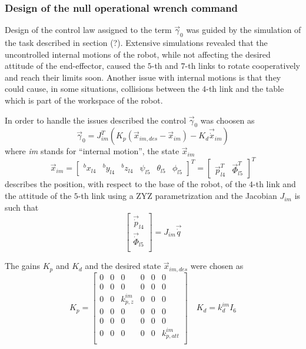 \subsubsection{Design of the null operational wrench command}
Design of the control law assigned to the term $\vec{\gamma}_{0}$ was
guided by the simulation of the task described in section (?). Extensive simulations
revealed that the uncontrolled internal motions of the robot, while not affecting the desired
attitude of the end-effector, caused the $5$-th and $7$-th links to rotate cooperatively and reach
their limits soon. Another issue with internal motions is that they could cause, in some situations,
collisions between the $4$-th link and the table which is part of the workspace of the robot.
\par
In order to handle the issues described the control $\vec{\gamma}_0$ was choosen as
\[
\vec{\gamma}_{0} = J_{im} ^{T} (K_p (\vec{x}_{im,des} - \vec{x}_{im} ) - K_d \vec{\dot{x}}_{im})
\]
where \emph{im} stands for ``internal motion'', the state $\vec{x}_{im}$
\[
\vec{x}_{im} =
\begin{bmatrix}
  {}^{b} x_{l4} & {}^{b} y_{l4} & {}^{b} z_{l4} & \psi_{l5} & \theta_{l5} & \phi_{l5}
\end{bmatrix}^{T} =
\begin{bmatrix}
  \vec{p}^{T}_{l4} & \vec{\Phi}^{T}_{l5}
\end{bmatrix}^{T}
\]
describes the position, with respect to the base of the robot, of the $4$-th link
and the attitude of the $5$-th link using a ZYZ parametrization and the Jacobian
$J_{im}$ is such that
\[
\begin{bmatrix}
  \vec{\dot{p}}_{l4} \\
  \vec{\dot{\Phi}}_{l5} \\
\end{bmatrix} =
J_{im} \vec{\dot{q}}
\]
\par
The gains $K_p$ and $K_d$ and the desired state $\vec{x}_{im,des}$ were chosen as
\[
K_p =
\begin{bmatrix}
  0 & 0 & 0 & 0 & 0 & 0\\
  0 & 0 & 0 & 0 & 0 & 0\\
  0 & 0 & k_{p,z}^{im} & 0 & 0 & 0\\
  0 & 0 & 0 & 0 & 0 & 0\\
  0 & 0 & 0 & 0 & 0 & 0\\
  0 & 0 & 0 & 0 & 0 & k_{p, att}^{im}\\
\end{bmatrix}
\quad
K_d = k_{d}^{im} I_{6}
\]
